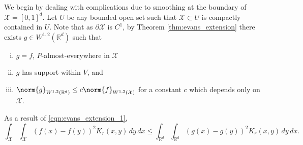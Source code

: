 \documentclass{article}
\newcommand{\Reals}{\mathbb{R}}
\newcommand{\1}{\mathbf{1}}
\newcommand{\Rd}{\Reals^d}
\newcommand{\Xset}{\mathcal{X}}
\theoremstyle{alden}
\theoremstyle{aldenthm}
\theoremstyle{definition}
\theoremstyle{remark}
\begin{document}
We begin by dealing with complications due to smoothing at the boundary of $\mathcal{X} = [0,1]^d$. Let $U$ be any bounded open set such that $\Xset \subset U$ is compactly contained in $U$. Note that as $\partial \Xset$ is $C^1$, by Theorem \ref{thm:evans_extension} there exists $g \in W^{1,2}(\Reals^d)$ such that
\begin{enumerate}[(i)]
	\item
	\label{eqn:evans_extension_1}
	$g = f$, $P$-almost-everywhere in $\Xset$
	\item 
	$g$ has support within $V$, and  
	\item 
	\label{eqn:sobolev_1_bound_2}
	$\norm{g}_{W^{1,2}(\Rd)} \leq c \norm{f}_{W^{1,2}(\Xset)}$ for a constant $c$ which depends only on $\Xset$.
\end{enumerate}
As a result of \ref{eqn:evans_extension_1},
\begin{equation}
\label{eqn:sobolev_1_bound_1}
\int_{\Xset} \int_{\Xset} (f(x) - f(y))^2K_r(x,y) \,dy \,dx \leq \int_{\Rd} \int_{\Rd} (g(x) - g(y))^2K_r(x,y) \,dy \,dx.
\end{equation}
\end{document}
